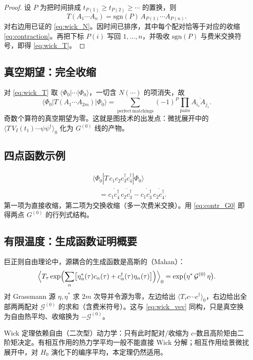 \begin{proof}
设 $P$ 为把时间排成 $t_{P(1)}\ge t_{P(2)}\ge\cdots$ 的置换，则
\begin{equation}
  T(A_1\cdots A_n)
  =\mathrm{sgn}(P)\,
  A_{P(1)}\cdots A_{P(n)}.
\end{equation}
对右边用已证的 \eqref{eq:wick_N}。因时间已排序，其中每个配对恰等于对应的收缩 \eqref{eq:contraction}。再把下标 $P(i)$ 写回 $1,\ldots,n$，并吸收 $\mathrm{sgn}(P)$ 与费米交换符号，即得 \eqref{eq:wick_T}。
\end{proof}

\subsection{真空期望：完全收缩}

对 \eqref{eq:wick_T} 取 $\langle\Phi_0|\cdots|\Phi_0\rangle$，一切含 $N(\cdots)$ 的项消失，故
\begin{equation}
  \langle\Phi_0|T(A_1\cdots A_{2m})|\Phi_0\rangle
  =\sum_{\mathrm{perfect\,matchings}}
  (-1)^P
  \prod_{\mathrm{pairs}}
  \overline{A_{i_s}A_{j_s}}.
\label{eq:wick_vev}
\end{equation}
奇数个算符的真空期望为零。这就是图技术的出发点：微扰展开中的
$\langle T\,V_I(t_1)\cdots\psi\psi^\dagger\rangle_0$ 化为 $G^{(0)}$ 线的产物。

\subsection{四点函数示例}

\begin{equation}
\begin{aligned}
  &\langle\Phi_0|
  T\,c_1 c_2 c_3^\dagger c_4^\dagger
  |\Phi_0\rangle\\
  &\quad=
  \overline{c_1 c_4^\dagger}\,\overline{c_2 c_3^\dagger}
  -\overline{c_1 c_3^\dagger}\,\overline{c_2 c_4^\dagger}.
\end{aligned}
\end{equation}
第一项为直接收缩，第二项为交换收缩（多一次费米交换）。用 \eqref{eq:contr_G0} 即得两点 $G^{(0)}$ 的行列式结构。

\subsection{有限温度：生成函数证明概要}

巨正则自由理论中，源耦合的生成函数是高斯的（Mahan）：
\begin{equation}
  \Bigl\langle
  T_\tau\exp\Bigl(
  \sum_\alpha
  \bigl[
  \eta_\alpha^*(\tau)c_\alpha(\tau)
  +c_\alpha^\dagger(\tau)\eta_\alpha(\tau)
  \bigr]
  \Bigr)
  \Bigr\rangle_0
  =\exp\bigl(\eta^*\,\mathcal{G}^{(0)}\,\eta\bigr).
\end{equation}
对 Grassmann 源 $\eta,\eta^*$ 求 $2m$ 次导并令源为零，左边给出
$\langle T_\tau c\cdots c^\dagger\rangle_0$，右边给出全部两两配对 $\mathcal{G}^{(0)}$ 的求和（含费米符号）。这与 \eqref{eq:wick_vev} 同构，只是真空换为自由热平均、收缩换为 $-\mathcal{G}^{(0)}$。

\begin{note}
Wick 定理依赖自由（二次型）动力学：只有此时配对/收缩为 $c$-数且高阶矩由二阶矩决定。有相互作用的热力学平均一般不能直接 Wick 分解；相互作用绘景微扰展开中，对 $H_0$ 演化下的编序平均，本定理仍然适用。
\end{note}
